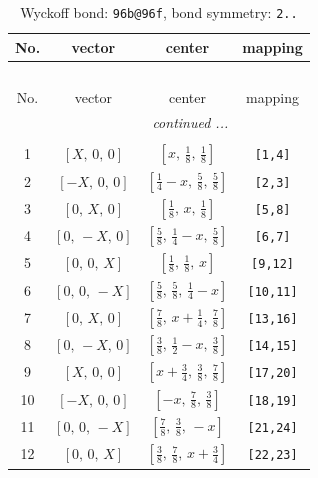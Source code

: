 \documentclass[fleqn,8pt]{jsarticle}
\begin{document}
\begin{longtable}{cccc}
\caption{Wyckoff bond: {\tt 96b@96f}, bond symmetry: {\tt 2..}}
 \\
 \hline \hline
No. & vector & center & mapping \\ \hline \endfirsthead

\multicolumn{3}{l}{\tablename\ \thetable{}} \\
 \hline \hline
No. & vector & center & mapping \\ \hline \endhead

 \hline \hline
\multicolumn{3}{r}{\footnotesize\it continued ...} \\ \endfoot

 \hline \hline
\multicolumn{3}{r}{} \\ \endlastfoot

1 & $\left[ X,\, 0,\, 0 \right]$ & $\left[ x,\, \frac{1}{8},\, \frac{1}{8} \right]$ & {\tt [1,4]} \\ \hline
2 & $\left[ - X,\, 0,\, 0 \right]$ & $\left[ \frac{1}{4} - x,\, \frac{5}{8},\, \frac{5}{8} \right]$ & {\tt [2,3]} \\ \hline
3 & $\left[ 0,\, X,\, 0 \right]$ & $\left[ \frac{1}{8},\, x,\, \frac{1}{8} \right]$ & {\tt [5,8]} \\ \hline
4 & $\left[ 0,\, - X,\, 0 \right]$ & $\left[ \frac{5}{8},\, \frac{1}{4} - x,\, \frac{5}{8} \right]$ & {\tt [6,7]} \\ \hline
5 & $\left[ 0,\, 0,\, X \right]$ & $\left[ \frac{1}{8},\, \frac{1}{8},\, x \right]$ & {\tt [9,12]} \\ \hline
6 & $\left[ 0,\, 0,\, - X \right]$ & $\left[ \frac{5}{8},\, \frac{5}{8},\, \frac{1}{4} - x \right]$ & {\tt [10,11]} \\ \hline
7 & $\left[ 0,\, X,\, 0 \right]$ & $\left[ \frac{7}{8},\, x + \frac{1}{4},\, \frac{7}{8} \right]$ & {\tt [13,16]} \\ \hline
8 & $\left[ 0,\, - X,\, 0 \right]$ & $\left[ \frac{3}{8},\, \frac{1}{2} - x,\, \frac{3}{8} \right]$ & {\tt [14,15]} \\ \hline
9 & $\left[ X,\, 0,\, 0 \right]$ & $\left[ x + \frac{3}{4},\, \frac{3}{8},\, \frac{7}{8} \right]$ & {\tt [17,20]} \\ \hline
10 & $\left[ - X,\, 0,\, 0 \right]$ & $\left[ - x,\, \frac{7}{8},\, \frac{3}{8} \right]$ & {\tt [18,19]} \\ \hline
11 & $\left[ 0,\, 0,\, - X \right]$ & $\left[ \frac{7}{8},\, \frac{3}{8},\, - x \right]$ & {\tt [21,24]} \\ \hline
12 & $\left[ 0,\, 0,\, X \right]$ & $\left[ \frac{3}{8},\, \frac{7}{8},\, x + \frac{3}{4} \right]$ & {\tt [22,23]} \\ \hline

\end{longtable}
\end{document}
